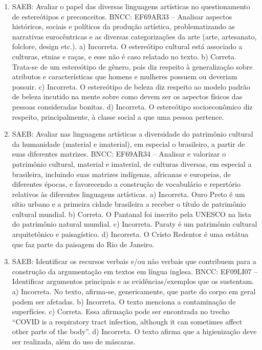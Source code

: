 \begin{enumerate}
\item
SAEB: Avaliar o papel das diversas linguagens artísticas no
questionamento de estereótipos e preconceitos.
BNCC: EF69AR33 -- Analisar aspectos históricos, sociais e políticos da
produção artística, problematizando as narrativas eurocêntricas e as
diversas categorizações da arte (arte, artesanato, folclore, design
etc.).
a) Incorreta. O estereótipo cultural está associado a culturas, etnias e
  raças, e esse não é caso relatado no texto.
b) Correta. Trata-se de um estereótipo de gênero, pois diz respeito à
  generalização sobre atributos e características que homens e mulheres
  possuem ou deveriam possuir.
c) Incorreta. O estereótipo de beleza diz respeito ao modelo padrão de
  beleza incutido na mente sobre como devem ser os aspectos físicos das
  pessoas consideradas bonitas.
d) Incorreta. O estereótipo socioeconômico diz respeito,
  principalmente, à classe social a que uma pessoa pertence.

\item
SAEB: Avaliar nas linguagens artísticas a diversidade do patrimônio
cultural da humanidade (material e imaterial), em especial o brasileiro,
a partir de suas diferentes matrizes.
BNCC: EF69AR34 -- Analisar e valorizar o patrimônio cultural, material e
imaterial, de culturas diversas, em especial a brasileira, incluindo
suas matrizes indígenas, africanas e europeias, de diferentes épocas, e
favorecendo a construção de vocabulário e repertório relativos às
diferentes linguagens artísticas.
a) Incorreta. Ouro Preto é um sítio urbano e a primeira cidade brasileira
  a receber o título de patrimônio cultural mundial.
b) Correta. O Pantanal foi inscrito pela UNESCO na lista do patrimônio
  natural mundial.
c) Incorreta. Paraty é um patrimônio cultural arquitetônico e
  paisagístico.
d) Incorreta. O Cristo Redentor é uma estátua que faz parte da paisagem
  do Rio de Janeiro.

\item
SAEB: Identificar os recursos verbais e/ou não verbais que contribuem
para a construção da argumentação em textos em língua inglesa. BNCC:
EF09LI07 -- Identificar argumentos principais e as evidências/exemplos
que os sustentam.
a) Incorreta. No texto, afirma-se, genericamente, que parte do corpo em
geral podem ser afetadas. b) Incorreta. O texto menciona a contaminação
de superfícies. c) Correta. Essa afirmação pode ser encontrada no trecho
``COVID is a respiratory tract infection, although it can sometimes
affect other parts of the body''. d) Incorreta. O texto afirma que a
higienização deve ser realizada, além do uso de máscaras.


\end{enumerate}
